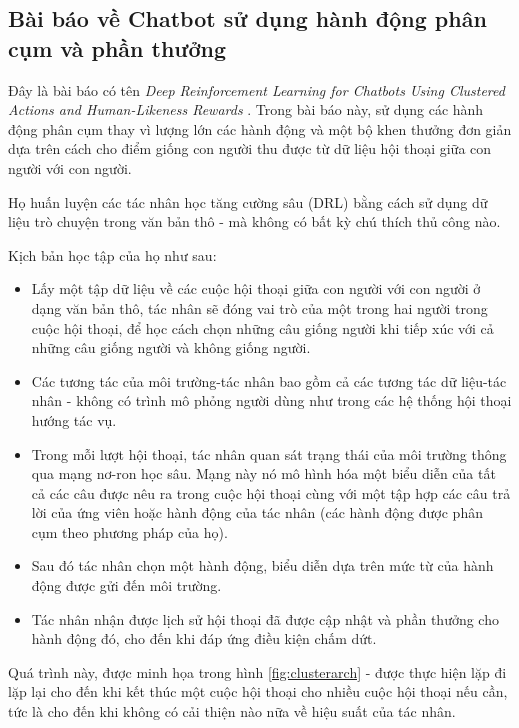 \subsection{Bài báo về Chatbot sử dụng hành động phân cụm và phần thưởng}
Đây là bài báo có tên \textit{Deep Reinforcement Learning for
Chatbots Using Clustered Actions and Human-Likeness Rewards}
\cite{clustered}. Trong bài báo này, sử dụng các hành động phân cụm
thay vì lượng lớn các hành động và một bộ khen thưởng đơn giản
dựa trên cách cho điểm giống con người thu được từ dữ liệu hội thoại
giữa con người với con người.

Họ huấn luyện các tác nhân học tăng cường sâu (DRL) bằng cách sử dụng
dữ liệu trò chuyện trong văn bản thô - mà không có bất kỳ chú thích
thủ công nào.

Kịch bản học tập của họ như sau:

\begin{itemize}
    \item Lấy một tập dữ liệu về các cuộc hội thoại giữa con người
    với con người ở dạng văn bản thô, tác nhân sẽ đóng vai trò của
    một trong hai người trong cuộc hội thoại, để học cách chọn những
    câu giống người khi tiếp xúc với cả những câu giống người và
    không giống người.
    \item Các tương tác của môi trường-tác nhân bao gồm cả các
    tương tác dữ liệu-tác nhân - không có trình mô phỏng người dùng
    như trong các hệ thống hội thoại hướng tác vụ.
    \item Trong mỗi lượt hội thoại, tác nhân quan sát trạng thái của
    môi trường thông qua mạng nơ-ron học sâu. Mạng này nó mô hình hóa
    một biểu diễn của tất cả các câu được nêu ra trong cuộc hội thoại
    cùng với một tập hợp các câu trả lời của ứng viên hoặc hành động
    của tác nhân (các hành động được phân cụm theo phương pháp của họ).
    \item Sau đó tác nhân chọn một hành động, biểu diễn dựa trên mức
    từ của hành động được gửi đến môi trường.
    \item Tác nhân nhận được lịch sử hội thoại đã được cập nhật và
    phần thưởng cho hành động đó, cho đến khi đáp ứng điều kiện chấm dứt.
\end{itemize}

Quá trình này, được minh họa trong hình \ref{fig:clusterarch} - được
thực hiện lặp đi lặp lại cho đến khi kết thúc một cuộc hội thoại cho
nhiều cuộc hội thoại nếu cần, tức là cho đến khi không có cải thiện
nào nữa về hiệu suất của tác nhân.

